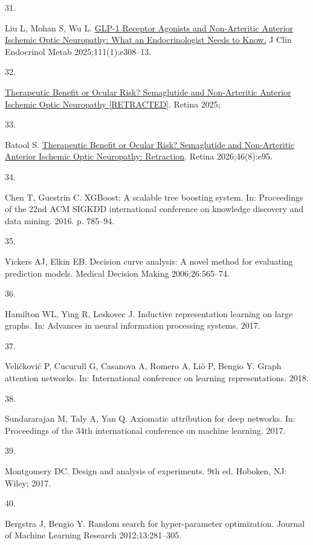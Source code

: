 \documentclass[
  11pt,
]{article}
\newlength{\cslhangindent}
\newlength{\csllabelwidth}
\newenvironment{CSLReferences}[2] %
 {\begin{list}{}{%
  \setlength{\itemindent}{0pt}
  \setlength{\leftmargin}{0pt}
  \setlength{\parsep}{0pt}
  \ifodd #1
   \setlength{\leftmargin}{\cslhangindent}
   \setlength{\itemindent}{-1\cslhangindent}
  \fi
  \setlength{\itemsep}{#2\baselineskip}}}
 {\end{list}}
\newcommand{\CSLLeftMargin}[1]{\parbox[t]{\csllabelwidth}{\strut#1\strut}}
\newcommand{\CSLRightInline}[1]{\parbox[t]{\linewidth - \csllabelwidth}{\strut#1\strut}}
\begin{document}
\begin{CSLReferences}{0}{1}
\CSLLeftMargin{31. }%
\CSLRightInline{Liu L, Mohan S, Wu L.
\href{https://doi.org/10.1210/clinem/dgaf541}{{GLP-1 Receptor Agonists
and Non-Arteritic Anterior Ischemic Optic Neuropathy: What an
Endocrinologist Needs to Know.}} J Clin Endocrinol Metab
2025;111(1):e308--13. }

\CSLLeftMargin{32. }%
\CSLRightInline{\href{https://doi.org/10.1097/IAE.0000000000004709}{{Therapeutic
Benefit or Ocular Risk? Semaglutide and Non-Arteritic Anterior Ischemic
Optic Neuropathy {[}RETRACTED{]}}}. Retina 2025;}

\CSLLeftMargin{33. }%
\CSLRightInline{Batool S.
\href{https://doi.org/10.1097/IAE.0000000000004884}{{Therapeutic Benefit
or Ocular Risk? Semaglutide and Non-Arteritic Anterior Ischemic Optic
Neuropathy: Retraction}}. Retina 2026;46(8):e95. }

\CSLLeftMargin{34. }%
\CSLRightInline{Chen T, Guestrin C. XGBoost: A scalable tree boosting
system. In: Proceedings of the 22nd ACM SIGKDD international conference
on knowledge discovery and data mining. 2016. p. 785--94.}

\CSLLeftMargin{35. }%
\CSLRightInline{Vickers AJ, Elkin EB. Decision curve analysis: A novel
method for evaluating prediction models. Medical Decision Making
2006;26:565--74. }

\CSLLeftMargin{36. }%
\CSLRightInline{Hamilton WL, Ying R, Leskovec J. Inductive
representation learning on large graphs. In: Advances in neural
information processing systems. 2017. }

\CSLLeftMargin{37. }%
\CSLRightInline{Veličković P, Cucurull G, Casanova A, Romero A, Liò P,
Bengio Y. Graph attention networks. In: International conference on
learning representations. 2018. }

\CSLLeftMargin{38. }%
\CSLRightInline{Sundararajan M, Taly A, Yan Q. Axiomatic attribution for
deep networks. In: Proceedings of the 34th international conference on
machine learning. 2017. }

\CSLLeftMargin{39. }%
\CSLRightInline{Montgomery DC. Design and analysis of experiments. 9th
ed. Hoboken, NJ: Wiley; 2017. }

\CSLLeftMargin{40. }%
\CSLRightInline{Bergstra J, Bengio Y. Random search for hyper-parameter
optimization. Journal of Machine Learning Research 2012;13:281--305. }


\end{CSLReferences}
\end{document}
